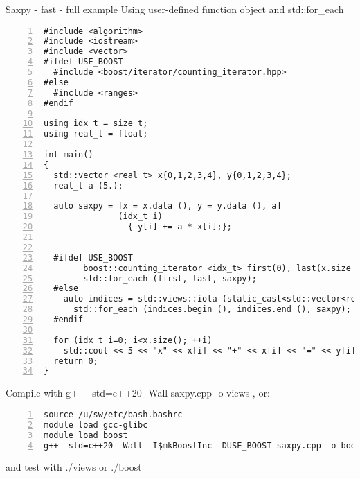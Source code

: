 \documentclass[10pt,aspectratio=169]{beamer}
\begin{document}
\begin{frame}{Saxpy - fast - full example}
Using user-defined function object and {\ttfamily std::for\_each}
\begin{lstlisting}[frame=single, style=cpp, firstnumber=1, numbers=left, numberstyle=\tiny,showtabs=false,xleftmargin=.05\linewidth,xrightmargin=.025\linewidth]
#include <algorithm>
#include <iostream>
#include <vector>
#ifdef USE_BOOST
  #include <boost/iterator/counting_iterator.hpp>
#else
  #include <ranges>
#endif

using idx_t = size_t;
using real_t = float;

int main()
{
  std::vector <real_t> x{0,1,2,3,4}, y{0,1,2,3,4};
  real_t a (5.);
  
  auto saxpy = [x = x.data (), y = y.data (), a] 
               (idx_t i)
	             { y[i] += a * x[i];};

  
  #ifdef USE_BOOST
		boost::counting_iterator <idx_t> first(0), last(x.size ());
		std::for_each (first, last, saxpy);
  #else
  	auto indices = std::views::iota (static_cast<std::vector<real_t>::size_type> (0),  x.size ());
	  std::for_each (indices.begin (), indices.end (), saxpy);           
  #endif
  
  for (idx_t i=0; i<x.size(); ++i)
  	std::cout << 5 << "x" << x[i] << "+" << x[i] << "=" << y[i] << std::endl;
  return 0;
}
\end{lstlisting}
Compile with {\ttfamily g++ -std=c++20 -Wall saxpy.cpp -o views} , or: 
\begin{lstlisting}[frame=single, style=cpp, firstnumber=1, numbers=left, numberstyle=\tiny,showtabs=false,xleftmargin=.05\linewidth,xrightmargin=.025\linewidth]
source /u/sw/etc/bash.bashrc
module load gcc-glibc
module load boost
g++ -std=c++20 -Wall -I$mkBoostInc -DUSE_BOOST saxpy.cpp -o boost
\end{lstlisting}
and test with {\ttfamily ./views} or {\ttfamily ./boost}
\end{frame}
\end{document}
